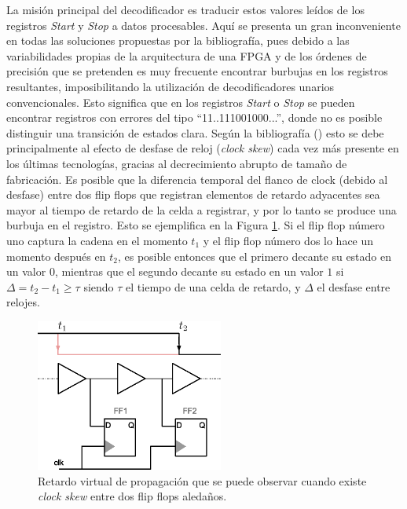 La misión principal del decodificador es traducir estos valores leídos de los registros \textit{Start} y \textit{Stop} a datos procesables. 
Aquí se presenta un gran inconveniente en todas las soluciones propuestas por la bibliografía, pues debido a las variabilidades
propias de la arquitectura de una FPGA y de los órdenes de precisión que se pretenden es muy frecuente encontrar burbujas en los registros
resultantes, imposibilitando la utilización de decodificadores unarios convencionales. Esto significa que en los registros \textit{Start} o
\textit{Stop} se pueden encontrar registros con errores del tipo ``11..111001000...'', donde no es posible distinguir una transición de
estados clara. Según la bibliografía (\cite{Machado}) esto se debe principalmente al efecto de desfase de reloj (\textit{clock skew})
cada vez más presente en los últimas tecnologías, gracias al decrecimiento abrupto de tamaño de fabricación. Es posible que la diferencia 
temporal del flanco de clock (debido al desfase) 
entre dos flip flops que registran elementos de retardo adyacentes sea mayor al tiempo de retardo de la celda a registrar, y por lo tanto 
se produce una burbuja en el registro. Esto se ejemplifica en la Figura \ref{fig: bubble}. Si el flip flop número uno
captura la cadena en el momento $t_1$ y el flip flop número dos lo hace un momento después en $t_2$, es posible entonces que el primero
decante su estado en un valor $0$, mientras que el segundo decante su estado en un valor $1$ si $\Delta = t_2 - t_1 \geq \tau$
siendo $\tau$ el tiempo de una celda de retardo, y $\Delta$ el desfase entre relojes.

\begin{figure}[H]
      \centering
      \includegraphics[width=0.55\textwidth]{imagenes/bubble.eps}
      \caption{Retardo virtual de propagación que se puede observar cuando existe \textit{clock skew} entre dos flip flops aledaños.}
      \label{fig: bubble}
\end{figure}

